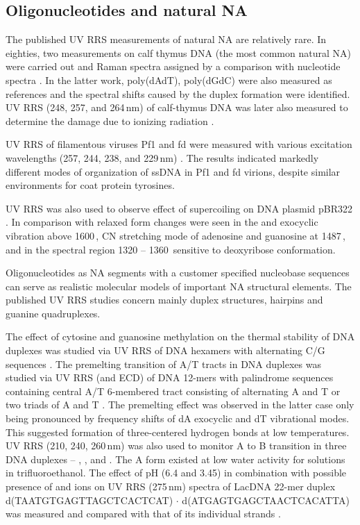 \subsection{Oligonucleotides and natural NA}

The published UV RRS measurements of natural NA are relatively rare.
In eighties, two measurements on calf thymus DNA (the most common natural NA)
were carried out and Raman spectra assigned by a comparison with nucleotide
spectra
\parencite{%
	Laigle1982a,%
	Fodor1986a%
}.
In the latter work, poly(dAdT), poly(dGdC) were also measured as references and
the spectral shifts caused by the duplex formation were identified.
UV RRS (248, 257, and 264\,nm) of calf-thymus DNA was later also measured to
determine the damage due to ionizing radiation
\parencite{Shaw2009}.

UV RRS of filamentous viruses Pf1 and fd were measured with various excitation
wavelengths (257, 244, 238, and 229\,nm)
\parencite{Wen1999}.
The results indicated markedly different modes of organization of ssDNA in Pf1
and fd virions, despite similar environments for coat protein tyrosines.

UV RRS was also used to observe effect of supercoiling on DNA plasmid pBR322
\parencite{Neugebauer2007}.
In comparison with relaxed form changes were seen in the  and exocyclic
 vibration above 1600\,\icm{}, CN stretching mode of adenosine and
guanosine at 1487\,\icm{}, and in the spectral region 1320 -- 1360\,\icm{}
sensitive to deoxyribose conformation.

Oligonucleotides as NA segments with a customer specified nucleobase sequences
can serve as realistic molecular models of important NA structural elements.
The published UV RRS studies concern mainly duplex structures, hairpins and
guanine quadruplexes.

The effect of cytosine and guanosine methylation on the thermal stability of
DNA duplexes was studied via UV RRS of DNA hexamers with alternating C/G
sequences
\parencite{%
	Laigle1986,%
	Chinsky1987%
}.
\textcite{Mukerji2002}
The premelting transition of A/T tracts in DNA duplexes was studied
via UV RRS (and ECD) of DNA 12-mers with palindrome sequences containing
central A/T 6-membered tract consisting of alternating A and T or two triads of
A and T
\parencite{Mukerji2002}.
The premelting effect was observed in the latter case only being pronounced by
frequency shifts of dA exocyclic  and dT 
vibrational modes.
This suggested formation of three-centered hydrogen bonds at low temperatures.
UV RRS (210, 240, 260\,nm) was also used to monitor A to B transition in three
DNA duplexes --
	,
	,
	and 
\parencite{Knee2008}.
The A form existed at low water activity for solutions in trifluoroethanol.
The effect of pH (6.4 and 3.45) in combination with possible presence of
 and  ions on UV RRS (275\,nm) spectra of LacDNA 22-mer
duplex
	d(TAATGTGAGTT\allowbreak{}AGCTCACTCAT)%
	$\cdot$%
	d(ATGAGTGAGCT\allowbreak{}AACTCACATTA)
was measured
and compared with that of its individual strands
\parencite{Muntean2013}.


